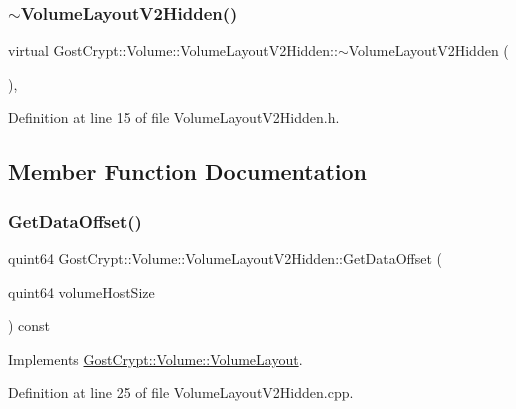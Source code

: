 \subsubsection{\texorpdfstring{$\sim$\+Volume\+Layout\+V2\+Hidden()}{~VolumeLayoutV2Hidden()}}
{\footnotesize\ttfamily virtual Gost\+Crypt\+::\+Volume\+::\+Volume\+Layout\+V2\+Hidden\+::$\sim$\+Volume\+Layout\+V2\+Hidden (\begin{DoxyParamCaption}{ }\end{DoxyParamCaption})\hspace{0.3cm}{\ttfamily [inline]}, {\ttfamily [virtual]}}



Definition at line 15 of file Volume\+Layout\+V2\+Hidden.\+h.



\subsection{Member Function Documentation}
\mbox{\label{class_gost_crypt_1_1_volume_1_1_volume_layout_v2_hidden_aa03f496e4a734339f50a804ad7d0d3cf}} 
\subsubsection{\texorpdfstring{Get\+Data\+Offset()}{GetDataOffset()}}
{\footnotesize\ttfamily quint64 Gost\+Crypt\+::\+Volume\+::\+Volume\+Layout\+V2\+Hidden\+::\+Get\+Data\+Offset (\begin{DoxyParamCaption}\item[{quint64}]{volume\+Host\+Size }\end{DoxyParamCaption}) const\hspace{0.3cm}{\ttfamily [virtual]}}



Implements \hyperlink{class_gost_crypt_1_1_volume_1_1_volume_layout_a967b9498adca758a2c721bdfb102e9a9}{Gost\+Crypt\+::\+Volume\+::\+Volume\+Layout}.



Definition at line 25 of file Volume\+Layout\+V2\+Hidden.\+cpp.

